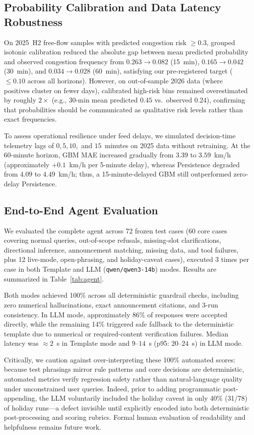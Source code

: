 \subsection{Probability Calibration and Data Latency Robustness}
On 2025~H2 free-flow samples with predicted congestion risk $\ge 0.3$, grouped isotonic calibration reduced the absolute gap between mean predicted probability and observed congestion frequency from $0.263 \rightarrow 0.082$ (15~min), $0.165 \rightarrow 0.042$ (30~min), and $0.034 \rightarrow 0.028$ (60~min), satisfying our pre-registered target ($\le 0.10$ across all horizons). However, on out-of-sample 2026 data (where positives cluster on fewer days), calibrated high-risk bins remained overestimated by roughly $2\times$ (e.g., 30-min mean predicted $0.45$ vs.\ observed $0.24$), confirming that probabilities should be communicated as qualitative risk levels rather than exact frequencies.

To assess operational resilience under feed delays, we simulated decision-time telemetry lags of $0, 5, 10,$ and $15$~minutes on 2025 data without retraining. At the 60-minute horizon, GBM MAE increased gradually from $3.39$ to $3.59$~km/h (approximately $+0.1$~km/h per 5-minute delay), whereas Persistence degraded from $4.09$ to $4.49$~km/h; thus, a 15-minute-delayed GBM still outperformed zero-delay Persistence.

\subsection{End-to-End Agent Evaluation}
We evaluated the complete agent across 72 frozen test cases (60 core cases covering normal queries, out-of-scope refusals, missing-slot clarifications, directional inference, announcement matching, missing data, and tool failures, plus 12 live-mode, open-phrasing, and holiday-caveat cases), executed 3 times per case in both Template and LLM (\texttt{qwen/qwen3-14b}) modes. Results are summarized in Table~\ref{tab:agent}.

Both modes achieved 100\% across all deterministic guardrail checks, including zero numerical hallucinations, exact announcement citations, and 3-run consistency. In LLM mode, approximately 86\% of responses were accepted directly, while the remaining 14\% triggered safe fallback to the deterministic template due to numerical or required-content verification failures. Median latency was $\approx 2$~s in Template mode and $9$--$14$~s (p95: $20$--$24$~s) in LLM mode.

Critically, we caution against over-interpreting these 100\% automated scores: because test phrasings mirror rule patterns and core decisions are deterministic, automated metrics verify regression safety rather than natural-language quality under unconstrained user queries. Indeed, prior to adding programmatic post-appending, the LLM voluntarily included the holiday caveat in only 40\% (31/78) of holiday runs---a defect invisible until explicitly encoded into both deterministic post-processing and scoring rubrics. Formal human evaluation of readability and helpfulness remains future work.


